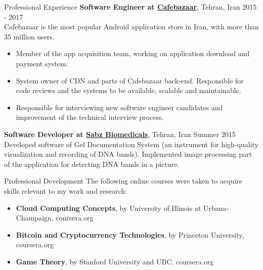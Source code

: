 \documentclass{resume} %
\begin{document}
\begin{rSection}{Professional Experience}
	{\bf Software Engineer at \href{https://cafebazaar.ir/}{Cafebazaar}}, Tehran, Iran \hfill 2015 - 2017
	\\ Cafebazaar is the most popular Android application store in Iran, with more than 35 million users.
	\begin{itemize}
		\item Member of the app acquisition team, working on application download and payment system.
		\item System owner of CDN and parts of Cafebazaar back-end. Responsible for code reviews and the systems to be available, scalable and maintainable.
		\item Responsible for interviewing new software engineer candidates and improvement of the technical interview process.
	\end{itemize}
	
	{\bf Software Developer at \href{http://www.sabzgroup.com/}{Sabz Biomedicals}}, Tehran, Iran \hfill Summer 2015
	\\Developed software of Gel Documentation System (an instrument for high-quality visualization and recording of DNA bands). Implemented image processing part of the application for detecting DNA bands in a picture.
\end{rSection}



\begin{rSection}{Professional Development}
	The following online courses were taken to acquire skills relevant to my work and research:
	\begin{itemize}
		\item {\bf Cloud Computing Concepts}, by University of Illinois at Urbana-Champaign, coursera.org
		\item {\bf Bitcoin and Cryptocurrency Technologies}, by Princeton University, coursera.org
		\item {\bf Game Theory}, by Stanford University and UBC, coursera.org
	\end{itemize}
\end{rSection}
\end{document}
